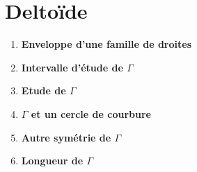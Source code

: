 \section{Deltoïde}
\begin{enumerate}
  \item \textbf{Enveloppe d'une famille de droites}
        

  \item \textbf{Intervalle d'étude de $\Gamma$}
        


  \item \textbf{Etude de $\Gamma$}
        


  \item \textbf{$\Gamma$ et un cercle de courbure}
        


  \item \textbf{Autre symétrie de $\Gamma$}
        


  \item \textbf{Longueur de $\Gamma$}
        
\end{enumerate}

